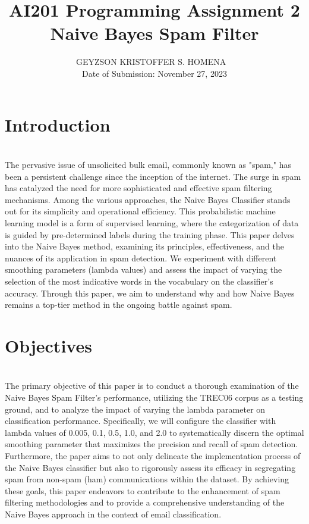 \documentclass{acm_proc_article-sp}
\begin{document}
\title{AI201 Programming Assignment 2\\Naive Bayes Spam Filter}

\author{
\alignauthor GEYZSON KRISTOFFER S. HOMENA
~\\
Date of Submission: November 27, 2023
}

\maketitle


\section{Introduction}~\\
The pervasive issue of unsolicited bulk email, commonly known as "spam," has been a persistent challenge since the inception of the internet. The surge in spam has catalyzed the need for more sophisticated and effective spam filtering mechanisms. Among the various approaches, the Naive Bayes Classifier stands out for its simplicity and operational efficiency. This probabilistic machine learning model is a form of supervised learning, where the categorization of data is guided by pre-determined labels during the training phase. This paper delves into the Naive Bayes method, examining its principles, effectiveness, and the nuances of its application in spam detection. We experiment with different smoothing parameters (lambda values) and assess the impact of varying the selection of the most indicative words in the vocabulary on the classifier’s accuracy. Through this paper, we aim to understand why and how Naive Bayes remains a top-tier method in the ongoing battle against spam.

\section{Objectives}~\\
The primary objective of this paper is to conduct a thorough examination of the Naive Bayes Spam Filter's performance, utilizing the TREC06 corpus as a testing ground, and to analyze the impact of varying the lambda parameter on classification performance. Specifically, we will configure the classifier with lambda values of 0.005, 0.1, 0.5, 1.0, and 2.0 to systematically discern the optimal smoothing parameter that maximizes the precision and recall of spam detection. Furthermore, the paper aims to not only delineate the implementation process of the Naive Bayes classifier but also to rigorously assess its efficacy in segregating spam from non-spam (ham) communications within the dataset. By achieving these goals, this paper endeavors to contribute to the enhancement of spam filtering methodologies and to provide a comprehensive understanding of the Naive Bayes approach in the context of email classification.
\end{document}
